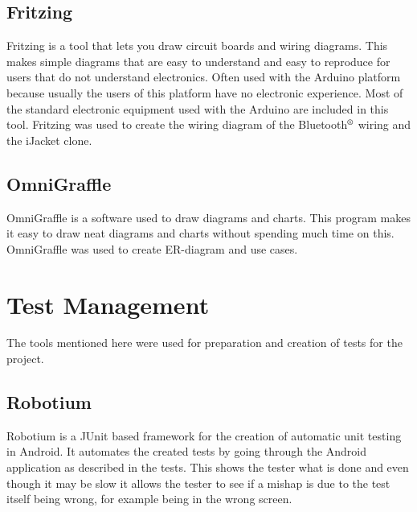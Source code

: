 \subsection{Fritzing}
Fritzing is a tool that lets you draw circuit boards and wiring diagrams. This makes simple diagrams that are easy to understand and easy to reproduce for users that do not understand electronics. Often used with the Arduino platform because usually the users of this platform have no electronic experience. Most of the standard electronic equipment used with the Arduino are included in this tool. Fritzing was used to create the wiring diagram of the Bluetooth$\textsuperscript{\textregistered}$ wiring and the iJacket clone.

\subsection{OmniGraffle}
OmniGraffle is a software used to draw diagrams and charts. This program makes it easy to draw neat diagrams and charts without spending much time on this. OmniGraffle was used to create ER-diagram and use cases.

\section{Test Management}
The tools mentioned here were used for preparation and creation of tests for the project. 

\subsection{Robotium}
Robotium is a JUnit based framework for the creation of automatic unit testing in Android. It automates the created tests by going through the Android application as described in the tests. This shows the tester what is done and even though it may be slow it allows the tester to see if a mishap is due to the test itself being wrong, for example being in the wrong screen.
